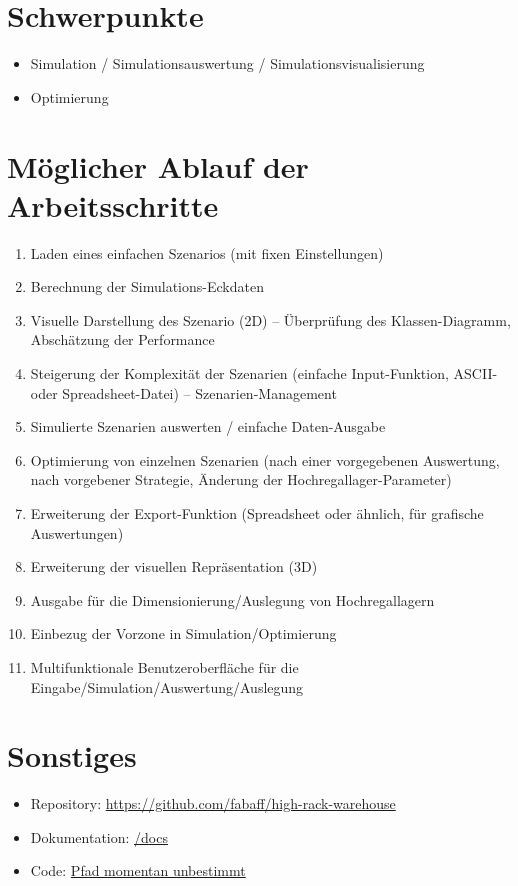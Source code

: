 \documentclass[11pt,a4paper]{article}
\begin{document}
\section{Schwerpunkte}
\begin{itemize}
  \item Simulation / Simulationsauswertung / Simulationsvisualisierung
  \item Optimierung
\end{itemize}
%
\section{Möglicher Ablauf der Arbeitsschritte}

\begin{enumerate}
  \item Laden eines einfachen Szenarios (mit fixen Einstellungen)
  \item Berechnung der Simulations-Eckdaten
  \item Visuelle Darstellung des Szenario (2D) -- Überprüfung des Klassen-Diagramm, Abschätzung der Performance
  \item Steigerung der Komplexität der Szenarien (einfache Input-Funktion, ASCII- oder Spreadsheet-Datei) -- Szenarien-Management
  \item Simulierte Szenarien auswerten / einfache Daten-Ausgabe
  \item Optimierung von einzelnen Szenarien (nach einer vorgegebenen Auswertung, nach vorgebener Strategie, Änderung der Hochregallager-Parameter)
  \item Erweiterung der Export-Funktion (Spreadsheet oder ähnlich, für grafische Auswertungen)
  \item Erweiterung der visuellen Repräsentation (3D)
  \item Ausgabe für die Dimensionierung/Auslegung von Hochregallagern
  \item Einbezug der Vorzone in Simulation/Optimierung
  \item Multifunktionale Benutzeroberfläche für die Eingabe/Simulation/Auswertung/Auslegung
\end{enumerate}
%
\section{Sonstiges}
\begin{itemize}
  \item Repository: \href{https://github.com/fabaff/high-rack-warehouse}{https://github.com/fabaff/high-rack-warehouse}
  \item Dokumentation: \href{https://github.com/fabaff/high-rack-warehouse/tree/master/docs}{/docs}
  \item Code: \href{https://github.com/fabaff/high-rack-warehouse/}{Pfad momentan unbestimmt}
\end{itemize}
\end{document}
